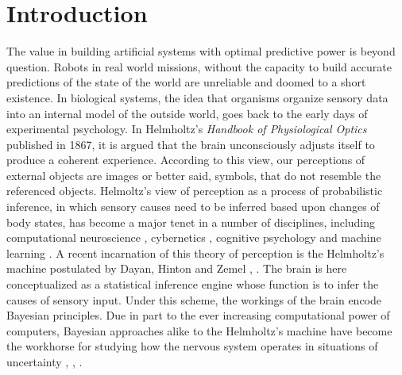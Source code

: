 \documentclass[11pt, onecolumn]{article}
\begin{document}
\section{Introduction}
The value in building artificial systems with optimal predictive power is beyond question. Robots in real world missions, without the capacity to build accurate predictions of the state of the world are unreliable and doomed to a short existence. 
In biological systems, the idea that organisms organize sensory data into an internal model of the outside world, goes back to the early days of experimental psychology. In Helmholtz's \emph{Handbook of Physiological Optics} published in 1867, it is argued that the brain unconsciously adjusts itself to produce a coherent experience. According to this view, our perceptions of external objects are images or better said, symbols, that do not resemble the referenced objects.  Helmoltz's view of perception as a process of probabilistic inference, in which sensory causes need to be inferred based upon changes of body states, has become a major tenet in a number of disciplines, including computational neuroscience \citep{Dayan:2002}, cybernetics \citep{ashby_introduction_2015}, cognitive psychology \citep{neisser_cognitive_2014} and machine learning \citep{neal_view_1998}.
A recent incarnation of this theory of perception is the Helmholtz's machine postulated by Dayan, Hinton and Zemel \citep{dayan_helmholtz_1995}, \citep{dayan_varieties_1996}. The brain is here conceptualized as a statistical inference engine whose function is to infer the causes of sensory input. 
Under this scheme, the workings of the brain encode Bayesian principles. Due in part to the ever increasing computational power of computers, Bayesian approaches alike to the Helmholtz's machine have become the workhorse for studying how the nervous system operates in situations of uncertainty \citep{rao_predictive_1999}, \citep{knill_bayesian_2004}, \citep{friston_history_2012}. 

\end{document}

